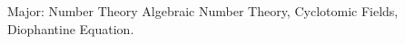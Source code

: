 


\begin{rubric}{Major: Number Theory}
Algebraic Number Theory, Cyclotomic Fields, Diophantine Equation.

\end{rubric}